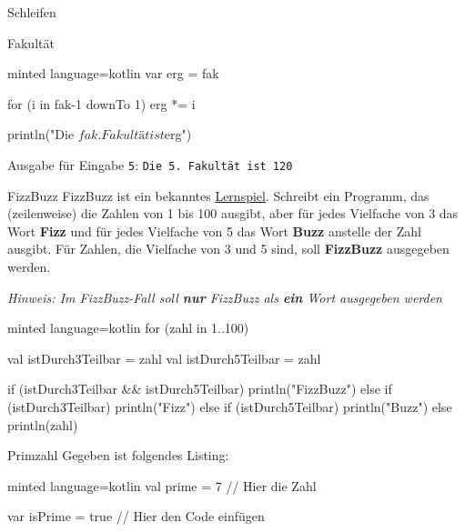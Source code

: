 \begin{task}[points=auto]{Schleifen}
\begin{subtask*}[points=0]{Fakultät }
\begin{solution}
\begin{codeBlock}[]{minted language=kotlin}
            var erg = fak

            for (i in fak-1 downTo 1) {
                erg *= i
            }

            println("Die $fak. Fakultät ist $erg")
            \end{codeBlock}

            Ausgabe für Eingabe \texttt{5}: \texttt{Die 5. Fakultät ist 120}
        \end{solution}
    \end{subtask*}
    \begin{subtask*}[points=0]{FizzBuzz }
        FizzBuzz ist ein bekanntes \href{https://en.wikipedia.org/wiki/Fizz_buzz}{Lernspiel}. Schreibt ein Programm, das (zeilenweise) die Zahlen von 1 bis 100 ausgibt, aber für jedes Vielfache von 3 das Wort \textbf{Fizz} und für jedes Vielfache von 5 das Wort \textbf{Buzz} anstelle der Zahl ausgibt. Für Zahlen, die Vielfache von 3 und 5 sind, soll \textbf{FizzBuzz} ausgegeben werden.

        \textit{Hinweis: Im FizzBuzz-Fall soll \textbf{nur} FizzBuzz als \textbf{ein} Wort ausgegeben werden}

        \begin{solution}
            \begin{codeBlock}[]{minted language=kotlin}
                for (zahl in 1..100) {
                    val istDurch3Teilbar = zahl %
                    val istDurch5Teilbar = zahl %

                    if (istDurch3Teilbar && istDurch5Teilbar) {
                        println("FizzBuzz")
                    } else if (istDurch3Teilbar) {
                        println("Fizz")
                    } else if (istDurch5Teilbar) {
                        println("Buzz")
                    } else {
                        println(zahl)
                    }
                }
            \end{codeBlock}
        \end{solution}
    \end{subtask*}
    \begin{subtask*}[points=0]{Primzahl }
        Gegeben ist folgendes Listing:
        \begin{codeBlock}[]{minted language=kotlin}
                val prime = 7 // Hier die Zahl

                var isPrime = true
                // Hier den Code einfügen


\end{codeBlock}
\end{subtask*}
\end{task}
